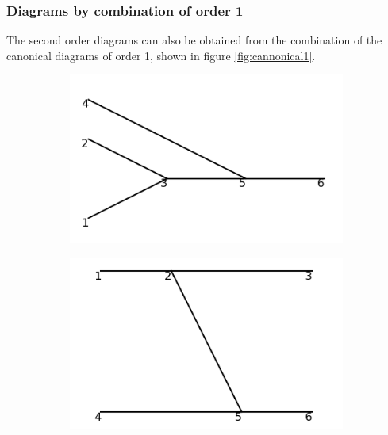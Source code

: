 \documentclass[11pt,a4paper,twoside,pdf]{article}
\numberwithin{equation}{section}
\begin{document}
\subsubsection{Diagrams by combination of order 1}
The second order diagrams can also be obtained from the combination of the canonical
diagrams of order 1, shown in figure \ref{fig:cannonical1}.

\begin{figure}[h!]
    \centering
    \begin{subfigure}[t]{0.19\textwidth}
        \centering
        \includegraphics[width=\textwidth]{plots/order2/from_order1/1.png}
        \caption{ }
        \label{fig:order2_from_order1/1}
    \end{subfigure}%
    \hfill
    \begin{subfigure}[t]{0.19\textwidth}
        \centering
        \includegraphics[width=\textwidth]{plots/order2/from_order1/2.png}
        \caption{ }
        \label{fig:order2_from_order1/2}
    \end{subfigure}

\end{figure}
\end{document}
